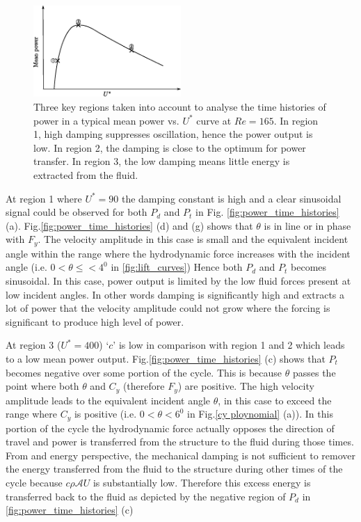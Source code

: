 \begin{figure}[h!]
\centering
\includegraphics[width=0.5\textwidth]{../FnP/sketch_1}
\caption{ Three key regions taken into account to analyse the time histories of power in a typical mean power vs. $U^*$ curve at $Re=165$. In region 1, high damping suppresses oscillation, hence the power output is low. In region 2, the damping is close to the optimum for power transfer. In region 3, the low damping means little energy is extracted from the fluid.}
\label{fig:regions_1}
\end{figure}

 
 
 
 At region 1 where $U^*=90$ the damping constant is high and a clear sinusoidal signal could be observed for both $P_d$ and $P_t$ in Fig. \ref{fig:power_time_histories} (a). Fig.\ref{fig:power_time_histories} (d) and (g) shows that $\theta$ is in line or in phase with $F_y$.  The velocity amplitude in this case is small and the equivalent incident angle within the range where the hydrodynamic force increases with the incident angle (i.e. $0<\theta \leq < 4^0$ in \ref{fig:lift_curves}) Hence both $P_d$ and $P_t$ becomes sinusoidal. In this case, power output is limited by the low fluid forces present at low incident angles. In other words damping is significantly high and extracts a lot of power that the velocity amplitude could not grow where the forcing  is significant to produce high level of power.   
 
 
  At region 3 ($U^*= 400$) `$c$' is low in comparison with region 1 and 2 which leads to a low mean power output. Fig.\ref{fig:power_time_histories} (c) shows that $P_t$ becomes negative over some portion of the cycle. This is because $\theta$  passes the point where both $\theta$ and $C_y$ (therefore $F_y$) are positive. The high velocity amplitude leads to the equivalent incident angle $\theta$, in this case to exceed the range where $C_y$ is positive (i.e. $0<\theta<6^0$ in Fig.\ref{cy ploynomial} (a)). In this portion of the cycle the hydrodynamic force actually opposes the direction of travel and power is transferred from the structure to the fluid during those times. From and energy perspective, the mechanical damping is not sufficient to remover the energy transferred from the fluid to the structure during other times of the cycle because $c\rho\mathcal{A}U$ is substantially low. Therefore this excess energy is transferred back to the fluid as depicted by the negative region of $P_d$ in \ref{fig:power_time_histories} (c) 
 

